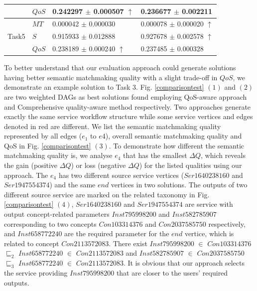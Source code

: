\documentclass{IEEEtran}
\begin{document}
\begin{table}[]
\begin{tabular}{l|l|l|l}
                        &$QoS$  &0.242297 $\pm$ 0.000507 $\uparrow$    &0.236677 $\pm$ 0.002211  \\ \hline
\multirow{3}{*}{Task5}  &$MT$   &  0.000042 $\pm$ 0.000030             &0.000078 $\pm$ 0.000020 $\uparrow$           \\ \cline{2-4} 
                        &$S$    &  0.915933 $\pm$ 0.012888             &0.927678 $\pm$ 0.002578 $\uparrow$                 \\ \cline{2-4}
                        &$QoS$  & 0.238189 $\pm$ 0.000240 $\uparrow$      &  0.237485 $\pm$  0.000328  \\ \hline                                                   
\end{tabular}
\end{table}

To better understand that our evaluation approach could generate solutions having better semantic matchmaking quality with a slight trade-off in $QoS$, we demonstrate an example solution to Task 3. Fig. \ref{comparisontest} $(1)$ and $(2)$ are two weighted DAGs as best solutions found employing QoS-aware approach and Comprehensive quality-aware method respectively. Two approaches generate exactly the same service workflow structure while some service vertices and edges denoted in red are different. We list the semantic matchmaking quality represented by all edges ($e_1$ to $e4$), overall semantic matchmaking quality and QoS in Fig. \ref{comparisontest} $(3)$. To demonstrate how different the semantic matchmaking quality is, we analyse $e_4$ that has the smallest $\Delta Q$, which reveals the gain (positive $\Delta Q$) or loss (negative $\Delta Q$) for the listed qualities using our approach. The $e_4$ has two different source service vertices ($Ser1640238160$ and $Ser1947554374$) and the same $end$ vertices in two solutions. The outputs of two different source service are marked on the related taxonomy in Fig. \ref{comparisontest} $(4)$, $Ser1640238160$ and $Ser1947554374$ are service with output concept-related parameters $Inst795998200$ and $Inst582785907$ corresponding to two concepts $Con103314376$ and $Con2037585750$ respectively, and $Inst658772240$ are the required parameter for the $end$ vertice, which is related to concept $Con2113572083$. There exist $Inst795998200$ $\in$ $Con103314376$ $\sqsubseteq_{2}$ $Inst658772240$ $\in$ $Con2113572083$ and $Inst582785907$ $\in$ $Con2037585750$ $\sqsubseteq_{3}$ $Inst658772240$ $\in$ $Con2113572083$. It is obvious that our approach selects the service providing $Inst795998200$ that are closer to the users' required outputs.
\end{document}
